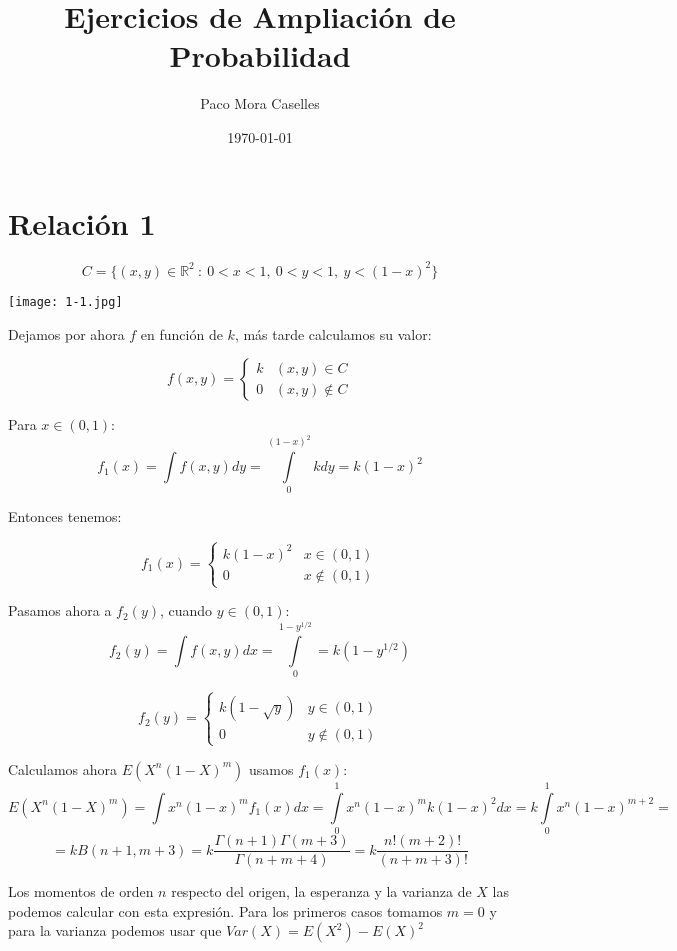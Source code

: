 \documentclass[openany]{book}
\title{Ejercicios de Ampliación de Probabilidad}
\author{Paco Mora Caselles}
\date{\today}
\begin{document}
\maketitle

\chapter{Relación 1}
\begin{exercise}
    $$  C = \{(x,y) \in \mathbb{R} ^2 \ :\ 0<x<1,\ 0<y<1,\ y < (1-x)^2\} $$

    \begin{center}
        \texttt{[image: 1-1.jpg]}
    \end{center}

    Dejamos por ahora $ f $ en función de $ k $, más tarde calculamos su valor:

    $$ f(x,y) = \left\{
    \begin{array}{lr}
        k & (x,y) \in C\\
        0 & (x,y) \not \in C   
    \end{array}
    \right. $$

    Para $ x \in (0,1) $:
    $$ f_{1}(x) = \int\limits_{}^{}f(x,y) dy = \int\limits_{0}^{(1-x)^2}k dy = k(1-x)^2 $$

    Entonces tenemos:

    $$ f_{1}(x) = \left\{
    \begin{array}{lr}
        k(1-x)^2 & x \in (0,1)\\
        0 & x \not \in (0,1)
    \end{array}
    \right. $$

    Pasamos ahora a $ f_{2}(y) $, cuando $ y \in (0,1) $:
    $$ f_{2}(y) = \int\limits_{}^{}f(x,y)dx = \int\limits_{0}^{1-y^{1/2}} = k (1-y^{1/2}) $$

    $$ f_{2}(y) = \left\{
    \begin{array}{lr}
        k(1-\sqrt{y}) & y \in (0,1) \\
        0 & y \not \in (0,1)
    \end{array}
    \right. $$

    Calculamos ahora $ E(X^{n}(1-X)^{m}) $ usamos $ f_{1}(x) $:
    $$ E(X^{n}(1-X)^{m}) = \int\limits_{}^{}x^{n}(1-x)^{m}f_{1}(x)dx = \int\limits_{0}^{1} x^{n}(1-x)^{m} k (1-x)^2 dx = k \int\limits_{0}^{1}x^{n}(1-x)^{m+2} =$$
    $$ =  kB(n+1,m+3) = k \dfrac{\Gamma(n+1)\Gamma(m+3)}{\Gamma(n+m+4)} = k \dfrac{n!(m+2)!}{(n+m+3)!} $$
    
    Los momentos de orden $ n $ respecto del origen, la esperanza y la varianza de $ X $ las podemos calcular con esta expresión. Para los primeros casos tomamos $ m=0 $ y para la varianza podemos usar que $ Var(X) = E(X^2)-E(X)^2 $


\end{exercise}
\end{document}
